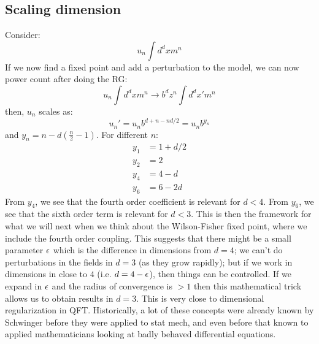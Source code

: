 \subsection{Scaling dimension}
Consider:
\begin{equation}
    u_n\int d^d x m^n
\end{equation}
If we now find a fixed point and add a perturbation to the model, we can now power count after doing the RG:
\begin{equation}
    u_n\int d^d x m^n \to b^d z^n \int d^dx' m^n
\end{equation}
then, $u_n$ scales as:
\begin{equation}
    u_n' = u_n b^{d+n-nd/2} = u_n b^{y_n}
\end{equation}
and $y_n = n - d\left(\frac{n}{2}-1\right)$. For different $n$:
\begin{subequations}
    \begin{align}
        y_1 &= 1 + d/2
        \\ y_2 &= 2
        \\ y_4 &= 4-d
        \\ y_6 &= 6 - 2d
    \end{align}
\end{subequations}
From $y_4$, we see that the fourth order coefficient is relevant for $d < 4$. From $y_6$, we see that the sixth order term is relevant for $d < 3$. This is then the framework for what we will next when we think about the Wilson-Fisher fixed point, where we include the fourth order coupling. This suggests that there might be a small parameter $\epsilon$ which is the difference in dimensions from $d = 4$; we can't do perturbations in the fields in $d = 3$ (as they grow rapidly); but if we work in dimensions in close to $4$ (i.e. $d = 4 - \epsilon$), then things can be controlled. If we expand in $\epsilon$ and the radius of convergence is $> 1$ then this mathematical trick allows us to obtain results in $d = 3$. This is very close to dimensional regularization in QFT. Historically, a lot of these concepts were already known by Schwinger before they were applied to stat mech, and even before that known to applied mathematicians looking at badly behaved differential equations.